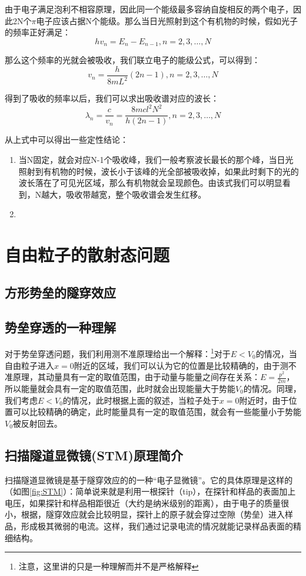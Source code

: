  由于电子满足泡利不相容原理，因此同一个能级最多容纳自旋相反的两个电子，因此2N个$\pi$电子应该占据N个能级。那么当日光照射到这个有机物的时候，假如光子的频率正好满足：
 \begin{equation}
     hv_n=E_n-E_{n-1},n=2,3,\dots,N
 \end{equation}
 
 那么这个频率的光就会被吸收，我们联立电子的能级公式，可以得到：
 \begin{equation}
     v_n=\frac{h}{8mL^2}(2n-1),n=2,3,\dots,N
 \end{equation}
 
 得到了吸收的频率以后，我们可以求出吸收谱对应的波长：
 \begin{equation}
     \lambda_n=\frac{c}{v_n}=\frac{8mcl^2N^2}{h(2n-1)},n=2,3,\dots,N
 \end{equation}
 
 从上式中可以得出一些定性结论：
 \begin{enumerate}
     \item 当N固定，就会对应N-1个吸收峰，我们一般考察波长最长的那个峰，当日光照射到有机物的时候，波长小于该峰的光全部被吸收掉，如果此时剩下的光的波长落在了可见光区域，那么有机物就会呈现颜色。由该式我们可以明显看到，N越大，吸收带越宽，整个吸收谱会发生红移。
     \item 
 \end{enumerate}
\section{自由粒子的散射态问题}
    \subsection{方形势垒的隧穿效应}
    
    \subsection{势垒穿透的一种理解}
    对于势垒穿透问题，我们利用测不准原理给出一个解释：\footnote{注意，这里讲的只是一种理解而并不是严格解释}对于$E<V_0$的情况，当自由粒子进入$x=0$附近的区域，我们可以认为它的位置是比较精确的，由于测不准原理，其动量具有一定的取值范围，由于动量与能量之间存在关系：$E=\frac{p^2}{2m}$，所以能量就会具有一定的取值范围，此时就会出现能量大于势能$V_0$的情况。同理，我们考虑$E<V_0$的情况，此时根据上面的叙述，当粒子处于$x=0$附近时，由于位置可以比较精确的确定，此时能量具有一定的取值范围，就会有一些能量小于势能$V_0$被反射回去。
    \subsection{扫描隧道显微镜(STM)原理简介}
    扫描隧道显微镜是基于隧穿效应的的一种“电子显微镜”。它的具体原理是这样的（如图\ref{fig:STM}）：简单说来就是利用一根探针（tip），在探针和样品的表面加上电压，如果探针和样品相距很近（大约是纳米级别的距离），由于电子的质量很小，根据，隧穿效应就会比较明显，探针上的原子就会穿过空隙（势垒）进入样品，形成极其微弱的电流。这样，我们通过记录电流的情况就能记录样品表面的精细结构。
    
